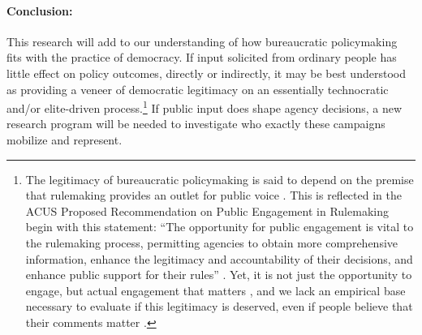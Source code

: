 




\paragraph{Conclusion:} This research will add to our understanding of how  bureaucratic policymaking fits with the practice of democracy.
If input solicited from ordinary people has little effect on policy outcomes, directly or indirectly, it may be best understood as providing a veneer of democratic legitimacy on an essentially technocratic and/or elite-driven process.\footnote{
The legitimacy of bureaucratic policymaking is said to depend on the premise that rulemaking provides an outlet for public voice \citep{Croley2003, Rosenbloom2003}. This is reflected in the ACUS Proposed Recommendation on Public Engagement in Rulemaking begin with this statement: ``The opportunity for public engagement is vital to the rulemaking process, permitting agencies to obtain more comprehensive information, enhance the legitimacy and accountability of their decisions, and enhance public support for their rules'' \citep{ACUS2018}. Yet, it is not just the opportunity to engage, but actual engagement that matters \citep{Herz2018}, and we lack an empirical base necessary to evaluate if this legitimacy is deserved, even if people believe that their comments matter \citep{Yackee2014JPART}.
} 
If public input does shape agency decisions, a new research program will be needed to investigate who exactly these campaigns mobilize and represent.


